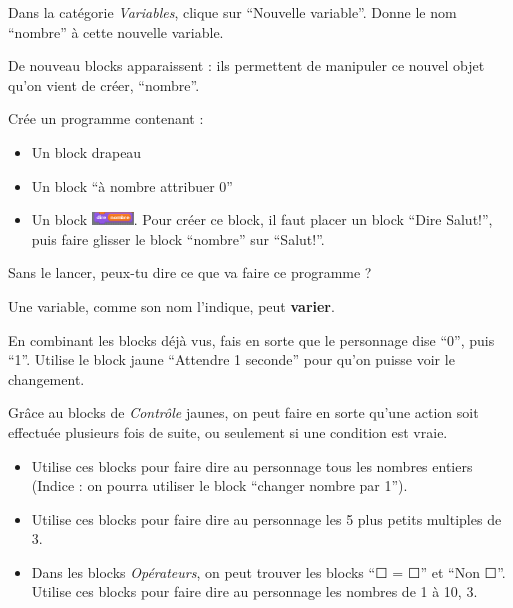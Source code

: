 \documentclass[a4paper,11pt]{article}
\begin{document}
\begin{exercice}[: Variables]
	Dans la catégorie \textit{Variables}, clique sur “Nouvelle variable”. Donne le nom “nombre” à cette nouvelle variable.

	De nouveau blocks apparaissent : ils permettent de manipuler ce nouvel objet qu'on vient de créer, “nombre”.

	Crée un programme contenant :
	\begin{itemize}
		\item Un block drapeau
		\item Un block “à nombre attribuer 0”
		\item Un block \includegraphics[width=3em]{Images/Dire nombre.png}. Pour créer ce block, il faut placer un block “Dire Salut!”, puis faire glisser le block “nombre” sur “Salut!”.
	\end{itemize}

	Sans le lancer, peux-tu dire ce que va faire ce programme ? \\[2em]

	\begin{greybox}
		Une variable, comme son nom l'indique, peut \textbf{varier}.
	\end{greybox}

	En combinant les blocks déjà vus, fais en sorte que le personnage dise “0”, puis “1”. Utilise le block jaune “Attendre 1 seconde” pour qu'on puisse voir le changement.
\end{exercice}

\begin{exercice}[: Boucles]
	Grâce au blocks de \textit{Contrôle} jaunes, on peut faire en sorte qu'une action soit effectuée plusieurs fois de suite, ou seulement si une condition est vraie.

	\begin{itemize}
		\item Utilise ces blocks pour faire dire au personnage tous les nombres entiers (Indice : on pourra utiliser le block “changer nombre par 1”).
		\item Utilise ces blocks pour faire dire au personnage les 5 plus petits multiples de 3.
		\item Dans les blocks \textit{Opérateurs}, on peut trouver les blocks “☐ = ☐” et “Non ☐”. Utilise ces blocks pour faire dire au personnage les nombres de 1 à 10,  3.
	\end{itemize}
\end{exercice}
\end{document}
